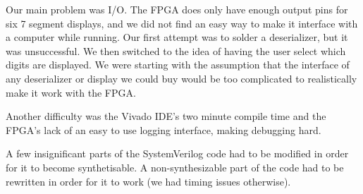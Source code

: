 \documentclass{scrartcl}
\begin{document}
Our main problem was I/O. The FPGA does only have enough output pins for six 7 segment displays, and we did not find an easy way to make it interface with a computer while running.
Our first attempt was to solder a deserializer, but it was unsuccessful.
We then switched to the idea of having the user select which digits are displayed.
We were starting with the assumption that the interface of any deserializer or display we could buy would be too complicated to realistically make it work with the FPGA.

Another difficulty was the Vivado IDE's two minute compile time and the FPGA's lack of an easy to use logging interface, making debugging hard.

A few insignificant parts of the SystemVerilog code had to be modified in order for it to become synthetisable. A non-synthesizable part of the code had to be rewritten in order for it to work (we had timing issues otherwise).
\end{document}
